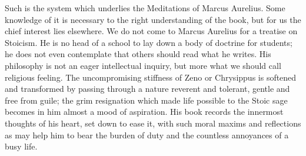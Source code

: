 Such is the system which underlies the Meditations of Marcus Aurelius. Some
knowledge of it is necessary to the right understanding of the book, but for us
the chief interest lies elsewhere. We do not come to Marcus Aurelius for a
treatise on Stoicism. He is no head of a school to lay down a body of doctrine
for students; he does not even contemplate that others should read what he
writes. His philosophy is not an eager intellectual inquiry, but more what we
should call religious feeling. The uncompromising stiffness of Zeno or
Chrysippus is softened and transformed by passing through a nature reverent and
tolerant, gentle and free from guile; the grim resignation which made life
possible to the Stoic sage becomes in him almost a mood of aspiration. His book
records the innermost thoughts of his heart, set down to ease it, with such
moral maxims and reflections as may help him to bear the burden of duty and the
countless annoyances of a busy life.

